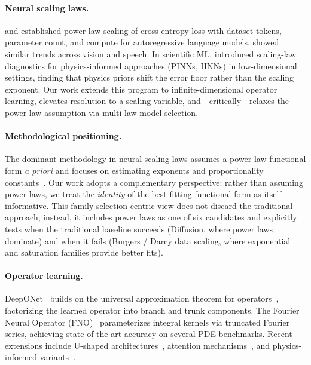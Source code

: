 \documentclass[11pt]{article}
\begin{document}
\paragraph{Neural scaling laws.}
\citet{kaplan2020scaling} and \citet{hoffmann2022training} established
power-law scaling of cross-entropy loss with dataset tokens, parameter
count, and compute for autoregressive language models.
\citet{hestness2017deep} showed similar trends across vision and speech.
In scientific ML, \citet{perrier2025scaling} introduced scaling-law
diagnostics for physics-informed approaches (PINNs, HNNs) in
low-dimensional settings, finding that physics priors shift the error
floor rather than the scaling exponent. Our work extends this program to
infinite-dimensional operator learning, elevates resolution to a
scaling variable, and---critically---relaxes the power-law assumption
via multi-law model selection.

\paragraph{Methodological positioning.}
The dominant methodology in neural scaling laws assumes a power-law
functional form \emph{a priori} and focuses on estimating exponents
and proportionality constants~\citep{kaplan2020scaling,hoffmann2022training,hestness2017deep}.
Our work adopts a complementary perspective: rather than assuming
power laws, we treat the \emph{identity} of the best-fitting
functional form as itself informative. This family-selection-centric
view does not discard the traditional approach; instead, it includes
power laws as one of six candidates and explicitly tests when the
traditional baseline succeeds (Diffusion, where power laws dominate)
and when it fails (Burgers / Darcy data scaling, where
exponential and saturation families provide better fits).

\paragraph{Operator learning.}
DeepONet~\citep{lu2021learning} builds on the universal approximation
theorem for operators~\citep{chen1995universal}, factorizing the learned
operator into branch and trunk components. The Fourier Neural Operator
(FNO)~\citep{li2021fourier} parameterizes integral kernels via
truncated Fourier series, achieving state-of-the-art accuracy on
several PDE benchmarks. Recent extensions include U-shaped
architectures~\citep{wen2022ufno}, attention
mechanisms~\citep{hao2023gnot}, and physics-informed
variants~\citep{wang2021learning}.
\end{document}
